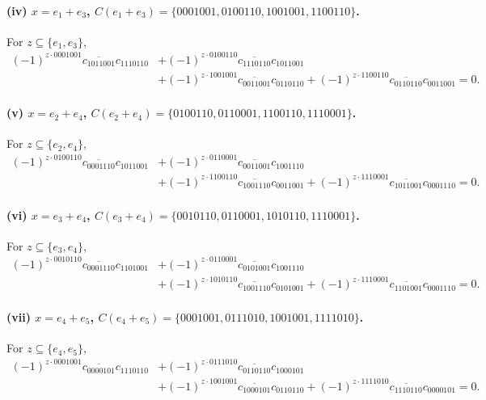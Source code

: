 \documentclass[11pt]{article}
\begin{document}
\paragraph{(iv) $x=e_1+e_3$, $C(e_1{+}e_3)=\{0001001,0100110,1001001,1100110\}$.}
For $z\subseteq\{e_1,e_3\}$,
\begin{align}
(-1)^{z\cdot 0001001}\overline{c_{1011001}}c_{1110110}
&+(-1)^{z\cdot 0100110}\overline{c_{1110110}}c_{1011001}\nonumber\\
&+(-1)^{z\cdot 1001001}\overline{c_{0011001}}c_{0110110}
+(-1)^{z\cdot 1100110}\overline{c_{0110110}}c_{0011001}=0.
\label{eq:offdiag-e1e3}
\end{align}

\paragraph{(v) $x=e_2+e_4$, $C(e_2{+}e_4)=\{0100110,0110001,1100110,1110001\}$.}
For $z\subseteq\{e_2,e_4\}$,
\begin{align}
(-1)^{z\cdot 0100110}\overline{c_{0001110}}c_{1011001}
&+(-1)^{z\cdot 0110001}\overline{c_{0011001}}c_{1001110}\nonumber\\
&+(-1)^{z\cdot 1100110}\overline{c_{1001110}}c_{0011001}
+(-1)^{z\cdot 1110001}\overline{c_{1011001}}c_{0001110}=0.
\label{eq:offdiag-e2e4}
\end{align}

\paragraph{(vi) $x=e_3+e_4$, $C(e_3{+}e_4)=\{0010110,0110001,1010110,1110001\}$.}
For $z\subseteq\{e_3,e_4\}$,
\begin{align}
(-1)^{z\cdot 0010110}\overline{c_{0001110}}c_{1101001}
&+(-1)^{z\cdot 0110001}\overline{c_{0101001}}c_{1001110}\nonumber\\
&+(-1)^{z\cdot 1010110}\overline{c_{1001110}}c_{0101001}
+(-1)^{z\cdot 1110001}\overline{c_{1101001}}c_{0001110}=0.
\label{eq:offdiag-e3e4}
\end{align}

\paragraph{(vii) $x=e_4+e_5$, $C(e_4{+}e_5)=\{0001001,0111010,1001001,1111010\}$.}
For $z\subseteq\{e_4,e_5\}$,
\begin{align}
(-1)^{z\cdot 0001001}\overline{c_{0000101}}c_{1110110}
&+(-1)^{z\cdot 0111010}\overline{c_{0110110}}c_{1000101}\nonumber\\
&+(-1)^{z\cdot 1001001}\overline{c_{1000101}}c_{0110110}
+(-1)^{z\cdot 1111010}\overline{c_{1110110}}c_{0000101}=0.
\label{eq:offdiag-e4e5}
\end{align}
\end{document}
